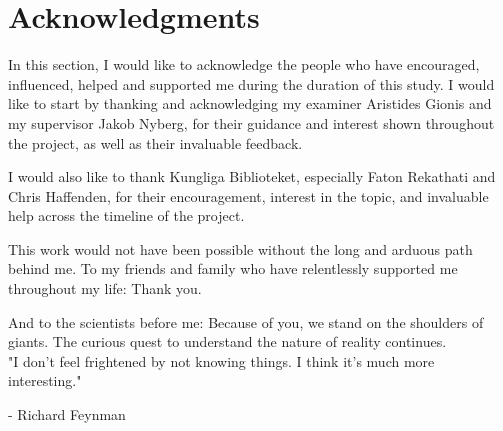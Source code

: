 \documentclass[oneside, english, bibtex]{kththesis}
\begin{document}
\cleardoublepage

\section*{Acknowledgments }

In this section, I would like to acknowledge the people who have encouraged, influenced, helped and supported me during the duration of this study.
I would like to start by thanking and acknowledging my examiner Aristides Gionis and my supervisor Jakob Nyberg, for their guidance and interest shown throughout the project, as well as their invaluable feedback. 

I would also like to thank Kungliga Biblioteket, especially Faton Rekathati and Chris Haffenden, for their encouragement, interest in the topic, and invaluable help across the timeline of the project.

This work would not have been possible without the long and arduous path behind me. To my friends and family who have relentlessly supported me throughout my life: Thank you.

And to the scientists before me: Because of you, we stand on the shoulders of giants. The curious quest to understand the nature of reality continues. \\[12pt]




"I don't feel frightened by not knowing things. I think it's much more interesting."

- Richard Feynman

\acknowlegmentssignature

\renewcommand{\chaptermark}[1]{ \markboth{#1}{}}
\tableofcontents
  \markboth{\contentsname}{}

\cleardoublepage
\listoffigures

\cleardoublepage

\listoftables
\cleardoublepage
\glsaddall
\printglossary[type=\acronymtype, title={List of acronyms and abbreviations}]
\label{pg:lastPageofPreface}
\mainmatter
\glsresetall
\renewcommand{\chaptermark}[1]{\markboth{#1}{}}
\end{document}
